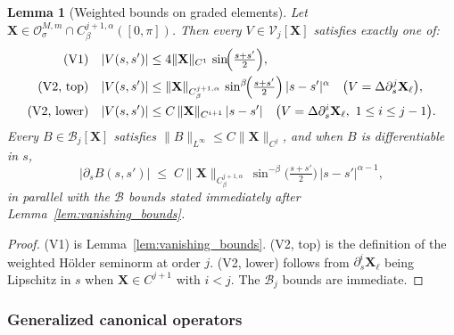\documentclass{amsart}
\newtheorem{lemma}[theorem]{Lemma}
\begin{document}
\begin{lemma}[Weighted bounds on graded elements]\label{lem:graded_bounds}
Let $\mathbf{X} \in \mathcal{O}^{M,m}_\sigma \cap C^{j+1,\alpha}_\beta([0,\pi])$. Then every $V \in \mathcal{V}_j[\mathbf{X}]$ satisfies exactly one of:
\begin{align}
\text{(V1)}\quad & |V(s,s')| \le 4\|\mathbf{X}\|_{C^1}\, \sin\!\Bigl(\tfrac{s+s'}{2}\Bigr),\label{eq:V1_bound}\\
\text{(V2, top)}\quad & |V(s,s')| \le \|\mathbf{X}\|_{C^{j+1,\alpha}_\beta}\,
  \sin^\beta\!\Bigl(\tfrac{s+s'}{2}\Bigr)\, |s-s'|^\alpha
  \quad \bigl(V = \Delta\partial_s^j\mathbf{X}_\ell\bigr), \label{eq:V2_top}\\
\text{(V2, lower)}\quad & |V(s,s')| \le C\, \|\mathbf{X}\|_{C^{i+1}}\, |s-s'|
  \quad \bigl(V = \Delta\partial_s^i\mathbf{X}_\ell,\ 1\le i\le j-1\bigr).
  \label{eq:V2_lower}
\end{align}
Every $B \in \mathcal{B}_j[\mathbf{X}]$ satisfies $\|B\|_{L^\infty} \le C\|\mathbf{X}\|_{C^j}$, and when $B$ is differentiable in $s$,
\[
|\partial_s B(s,s')| \;\le\; C\|\mathbf{X}\|_{C^{j+1,\alpha}_\beta}\,
\sin^{-\beta}\!\bigl(\tfrac{s+s'}{2}\bigr)\,|s-s'|^{\alpha-1},
\]
in parallel with the $\mathcal{B}$ bounds stated immediately after Lemma~\ref{lem:vanishing_bounds}.
\end{lemma}

\begin{proof}
(V1) is Lemma~\ref{lem:vanishing_bounds}. (V2, top) is the definition of the weighted Hölder seminorm at order $j$. (V2, lower) follows from $\partial_s^i\mathbf{X}_\ell$ being Lipschitz in $s$ when $\mathbf{X} \in C^{j+1}$ with $i < j$. The $\mathcal{B}_j$ bounds are immediate.
\end{proof}

\subsubsection{Generalized canonical operators}
\end{document}
